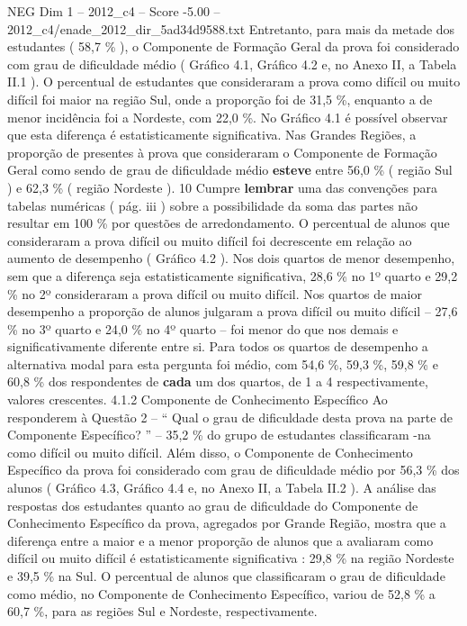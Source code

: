 \begin{textsample}{NEG Dim 1 – 2012\_c4 – Score -5.00 – 2012\_c4/enade\_2012\_dir\_5ad34d9588.txt}
Entretanto, para mais da metade dos estudantes ( 58,7 \% ), o Componente de Formação Geral da prova foi considerado com grau de dificuldade médio ( Gráfico 4.1, Gráfico 4.2 e, no Anexo II, a Tabela II.1 ).
O percentual de estudantes que consideraram a prova como difícil ou muito difícil foi maior na região Sul, onde a proporção foi de 31,5 \%, enquanto a de menor incidência foi a Nordeste, com 22,0 \%.
No Gráfico 4.1 é possível observar que esta diferença é estatisticamente significativa.
Nas Grandes Regiões, a proporção de presentes à prova que consideraram o Componente de Formação Geral como sendo de grau de dificuldade médio \textbf{esteve} entre 56,0 \% ( região Sul ) e 62,3 \% ( região Nordeste ). 10 Cumpre \textbf{lembrar} uma das convenções para tabelas numéricas ( pág. iii ) sobre a possibilidade da soma das partes não resultar em 100 \% por questões de arredondamento.
O percentual de alunos que consideraram a prova difícil ou muito difícil foi decrescente em relação ao aumento de desempenho ( Gráfico 4.2 ).
Nos dois quartos de menor desempenho, sem que a diferença seja estatisticamente significativa, 28,6 \% no 1º quarto e 29,2 \% no 2º consideraram a prova difícil ou muito difícil.
Nos quartos de maior desempenho a proporção de alunos julgaram a prova difícil ou muito difícil – 27,6 \% no 3º quarto e 24,0 \% no 4º quarto – foi menor do que nos demais e significativamente diferente entre si.
Para todos os quartos de desempenho a alternativa modal para esta pergunta foi médio, com 54,6 \%, 59,3 \%, 59,8 \% e 60,8 \% dos respondentes de \textbf{cada} um dos quartos, de 1 a 4 respectivamente, valores crescentes. 4.1.2 Componente de Conhecimento Específico Ao responderem à Questão 2 – “ Qual o grau de dificuldade desta prova na parte de Componente Específico? ” – 35,2 \% do grupo de estudantes classificaram -na como difícil ou muito difícil.
Além disso, o Componente de Conhecimento Específico da prova foi considerado com grau de dificuldade médio por 56,3 \% dos alunos ( Gráfico 4.3, Gráfico 4.4 e, no Anexo II, a Tabela II.2 ).
A análise das respostas dos estudantes quanto ao grau de dificuldade do Componente de Conhecimento Específico da prova, agregados por Grande Região, mostra que a diferença entre a maior e a menor proporção de alunos que a avaliaram como difícil ou muito difícil é estatisticamente significativa : 29,8 \% na região Nordeste e 39,5 \% na Sul.
O percentual de alunos que classificaram o grau de dificuldade como médio, no Componente de Conhecimento Específico, variou de 52,8 \% a 60,7 \%, para as regiões Sul e Nordeste, respectivamente.

\end{textsample}
